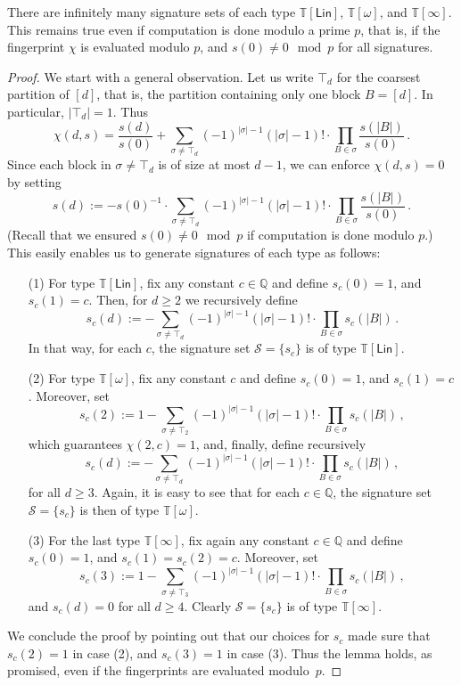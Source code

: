 \documentclass[authorcolumns,numberwithinsect]{no-lipics-v2022}
\begin{document}
\begin{lemma}
    There are infinitely many signature sets of each type $\mathbb{T}[\mathsf{Lin}]$, $\mathbb{T}[\omega]$, and $\mathbb{T}[\infty]$. This remains true even if computation is done modulo a prime $p$, that is, if the fingerprint $\chi$ is evaluated modulo $p$, and $s(0)\neq 0 \mod p$ for all signatures.
\end{lemma}
\begin{proof}
We start with a general observation. Let us  write $\top_d$ for the coarsest partition of $[d]$, that is, the partition containing only one block $B=[d]$. In particular, $|\top_d|=1$. Thus
\[ \chi(d,s) = \frac{s(d)}{s(0)} + \sum_{\sigma\neq \top_d} (-1)^{|\sigma|-1} (|\sigma|-1)! \cdot \prod_{B \in \sigma} \frac{s(|B|)}{s(0)}\,. \]
Since each block in $\sigma\neq \top_d$ is of size at most $d-1$, we can enforce $\chi(d,s)=0$ by setting
\[s(d):= -s(0)^{-1} \cdot \sum_{\sigma\neq \top_d} (-1)^{|\sigma|-1} (|\sigma|-1)! \cdot \prod_{B \in \sigma} \frac{s(|B|)}{s(0)}\,.\]
(Recall that we ensured $s(0)\neq 0 \mod p$ if computation is done modulo $p$.)
This easily enables us to generate signatures of each type as follows:
\begin{itemize}
    \item[(1)] For type $\mathbb{T}[\mathsf{Lin}]$, fix any constant $c\in \mathbb{Q}$ and define $s_c(0)=1$, and $s_c(1)=c$. Then, for $d\geq 2$ we recursively define
    \[s_c(d):= -\sum_{\sigma\neq \top_d} (-1)^{|\sigma|-1} (|\sigma|-1)! \cdot \prod_{B \in \sigma} s_c(|B|)\,.\]
    In that way, for each $c$, the signature set $\mathcal{S}=\{s_c\}$ is of type $\mathbb{T}[\mathsf{Lin}]$.
    \item[(2)] For type $\mathbb{T}[\mathsf{\omega}]$, fix any constant $c$ and define $s_c(0)=1$, and $s_c(1)=c$. Moreover, set
    \[s_c(2):= 1-\sum_{\sigma\neq \top_2} (-1)^{|\sigma|-1} (|\sigma|-1)! \cdot \prod_{B \in \sigma} s_c(|B|)\,,\]
    which guarantees $\chi(2,c)=1$, and, finally, define recursively
    \[s_c(d):= -\sum_{\sigma\neq \top_d} (-1)^{|\sigma|-1} (|\sigma|-1)! \cdot \prod_{B \in \sigma} s_c(|B|)\,,\]
    for all $d\geq 3$. Again, it is easy to see that for each $c\in \mathbb{Q}$, the signature set $\mathcal{S}=\{s_c\}$ is then of type $\mathbb{T}[\mathsf{\omega}]$.
    \item[(3)] For the last type $\mathbb{T}[\mathsf{\infty}]$, fix again any constant $c\in \mathbb{Q}$ and define $s_c(0)=1$, and $s_c(1)=s_c(2)=c$. Moreover, set
    \[s_c(3):= 1-\sum_{\sigma\neq \top_3} (-1)^{|\sigma|-1} (|\sigma|-1)! \cdot \prod_{B \in \sigma} s_c(|B|)\,,\]
    and $s_c(d)=0$ for all $d\geq 4$.
    Clearly $\mathcal{S}=\{s_c\}$ is of type $\mathbb{T}[\mathsf{\infty}]$.
\end{itemize}
We conclude the proof by pointing out that our choices for $s_c$ made sure that $s_c(2)=1$ in case (2), and $s_c(3)=1$ in case (3). Thus the lemma holds, as promised, even if the fingerprints are evaluated modulo~$p$.
\end{proof}
\end{document}
